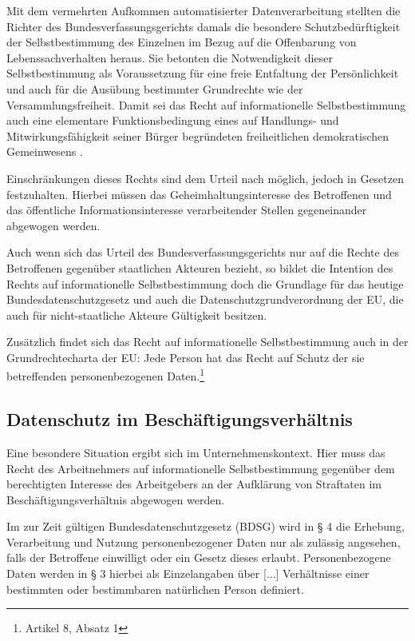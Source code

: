 Mit dem vermehrten Aufkommen automatisierter Datenverarbeitung stellten die Richter des Bundesverfassungsgerichts damals die besondere Schutzbedürftigkeit der Selbstbestimmung des Einzelnen im Bezug auf die Offenbarung von Lebenssachverhalten heraus. Sie betonten die Notwendigkeit dieser Selbstbestimmung als Voraussetzung für eine freie Entfaltung der Persönlichkeit und auch für die Ausübung bestimmter Grundrechte wie der Versammlungsfreiheit. Damit sei das Recht auf informationelle Selbstbestimmung auch \glqq eine elementare Funktionsbedingung eines auf Handlungs- und Mitwirkungsfähigkeit seiner Bürger begründeten freiheitlichen demokratischen Gemeinwesens\grqq{} \cite{TODO} .
    
Einschränkungen dieses Rechts sind dem Urteil nach möglich, jedoch in Gesetzen festzuhalten. Hierbei müssen das Geheimhaltungsinteresse des Betroffenen und das öffentliche Informationsinteresse verarbeitender Stellen gegeneinander abgewogen werden.

Auch wenn sich das Urteil des Bundesverfassungsgerichts nur auf die Rechte des Betroffenen gegenüber staatlichen Akteuren bezieht, so bildet die Intention des Rechts auf informationelle Selbstbestimmung doch die Grundlage für das heutige Bundesdatenschutzgesetz und auch die Datenschutzgrundverordnung der EU, die auch für nicht-staatliche Akteure Gültigkeit besitzen.

Zusätzlich findet sich das Recht auf informationelle Selbstbestimmung auch in der Grundrechtecharta der EU: \glqq Jede Person hat das Recht auf Schutz der sie betreffenden personenbezogenen Daten.\grqq{}\footnote{
  Artikel 8, Absatz 1
}

\subsection{Datenschutz im Beschäftigungsverhältnis}

Eine besondere Situation ergibt sich im Unternehmenskontext. Hier muss das Recht des Arbeitnehmers auf informationelle Selbstbestimmung gegenüber dem berechtigten Interesse des Arbeitgebers an der Aufklärung von Straftaten im Beschäftigungsverhältnis abgewogen werden. 

Im zur Zeit gültigen Bundesdatenschutzgesetz (BDSG) wird in § 4 die Erhebung, Verarbeitung und Nutzung personenbezogener Daten nur als zulässig angesehen, falls der Betroffene einwilligt oder ein Gesetz dieses erlaubt. Personenbezogene Daten werden in § 3 hierbei als \glqq Einzelangaben über [...] Verhältnisse einer bestimmten oder bestimmbaren natürlichen Person\grqq{}  definiert.

